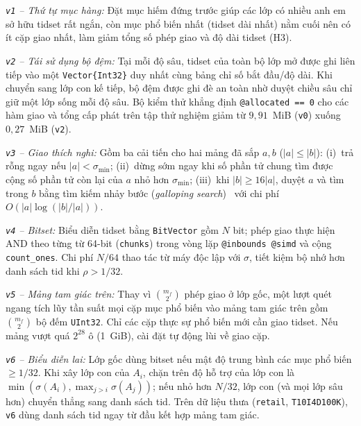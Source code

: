 \emph{\texttt{v1} -- Thứ tự mục hàng:} Đặt mục hiếm đứng trước giúp các lớp có nhiều anh em sở hữu tidset rất ngắn, còn mục phổ biến nhất (tidset dài nhất) nằm cuối nên có ít cặp giao nhất, làm giảm tổng số phép giao và độ dài tidset (H3).

\emph{\texttt{v2} -- Tái sử dụng bộ đệm:} Tại mỗi độ sâu, tidset của toàn bộ lớp mở được ghi liên tiếp vào một \texttt{Vector\{Int32\}} duy nhất cùng bảng chỉ số bắt đầu/độ dài. Khi chuyển sang lớp con kế tiếp, bộ đệm được ghi đè an toàn nhờ duyệt chiều sâu chỉ giữ một lớp sống mỗi độ sâu. Bộ kiểm thử khẳng định \texttt{@allocated == 0} cho các hàm giao và tổng cấp phát trên tập thử nghiệm giảm từ $9{,}91$~MiB (\texttt{v0}) xuống $0{,}27$~MiB (\texttt{v2}).

\emph{\texttt{v3} -- Giao thích nghi:} Gồm ba cải tiến cho hai mảng đã sắp $a, b$ ($|a| \le |b|$): (i)~trả rỗng ngay nếu $|a| < \sigma_{\min}$; (ii)~dừng sớm ngay khi số phần tử chung tìm được cộng số phần tử còn lại của $a$ nhỏ hơn $\sigma_{\min}$; (iii)~khi $|b| \ge 16|a|$, duyệt $a$ và tìm trong $b$ bằng tìm kiếm nhảy bước (\emph{galloping search})~\cite{bentley1976almost} với chi phí $O(|a|\log(|b|/|a|))$.

\emph{\texttt{v4} -- Bitset:} Biểu diễn tidset bằng \texttt{BitVector} gồm $N$ bit; phép giao thực hiện AND theo từng từ 64-bit (\texttt{chunks}) trong vòng lặp \texttt{@inbounds @simd} và cộng \texttt{count\_ones}. Chi phí $N/64$ thao tác từ máy độc lập với $\sigma$, tiết kiệm bộ nhớ hơn danh sách tid khi $\rho > 1/32$.

\emph{\texttt{v5} -- Mảng tam giác trên:} Thay vì $\binom{m_f}{2}$ phép giao ở lớp gốc, một lượt quét ngang tích lũy tần suất mọi cặp mục phổ biến vào mảng tam giác trên gồm $\binom{m_f}{2}$ bộ đếm \texttt{UInt32}. Chỉ các cặp thực sự phổ biến mới cần giao tidset. Nếu mảng vượt quá $2^{28}$ ô (1~GiB), cài đặt tự động lùi về giao cặp.

\emph{\texttt{v6} -- Biểu diễn lai:} Lớp gốc dùng bitset nếu mật độ trung bình các mục phổ biến $\ge 1/32$. Khi xây lớp con của $A_i$, chặn trên độ hỗ trợ của lớp con là $\min(\sigma(A_i), \max_{j > i} \sigma(A_j))$; nếu nhỏ hơn $N/32$, lớp con (và mọi lớp sâu hơn) chuyển thẳng sang danh sách tid. Trên dữ liệu thưa (\texttt{retail}, \texttt{T10I4D100K}), \texttt{v6} dùng danh sách tid ngay từ đầu kết hợp mảng tam giác.

